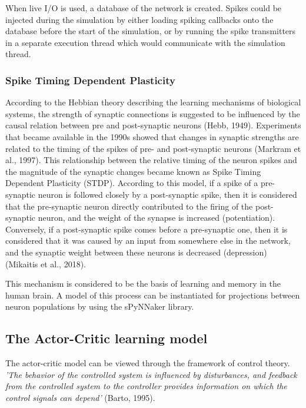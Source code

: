 \documentclass[10pt]{article}
\begin{document}
    When live I/O is used, a database of the network is created. Spikes could be injected during the simulation by either loading spiking callbacks onto the database before the start of the simulation, or by running the spike transmitters in a separate execution thread which would communicate with the simulation thread.

    \subsubsection{Spike Timing Dependent Plasticity}

    According to the Hebbian theory describing the learning mechanisms of biological systems, the strength of synaptic connections is suggested to be influenced by the causal relation between pre and post-synaptic neurons (Hebb, 1949). Experiments that became available in the 1990s showed that changes in synaptic strengths are related to the timing of the spikes of pre- and post-synaptic neurons (Markram et al., 1997). This relationship between the relative timing of the neuron spikes and the magnitude of the synaptic changes became known as Spike Timing Dependent Plasticity (STDP). According to this model, if a spike of a pre-synaptic neuron is followed closely by a post-synaptic spike, then it is considered that the pre-synaptic neuron directly contributed to the firing of the post-synaptic neuron, and the weight of the synapse is increased (potentiation). Conversely, if a post-synaptic spike comes before a pre-synaptic one, then it is considered that it was caused by an input from somewhere else in the network, and the synaptic weight between these neurons is decreased (depression) (Mikaitis et al., 2018).

    This mechanism is considered to be the basis of learning and memory in the human brain. A model of this process can be instantiated for projections between neuron populations by using the sPyNNaker library.

    \subsection{The Actor-Critic learning model}

    The actor-critic model can be viewed through the framework of control theory. \textit{'The behavior of the controlled system is influenced
    by disturbances, and feedback from the controlled system to the controller provides information on which the control signals can depend'} (Barto, 1995).
\end{document}
